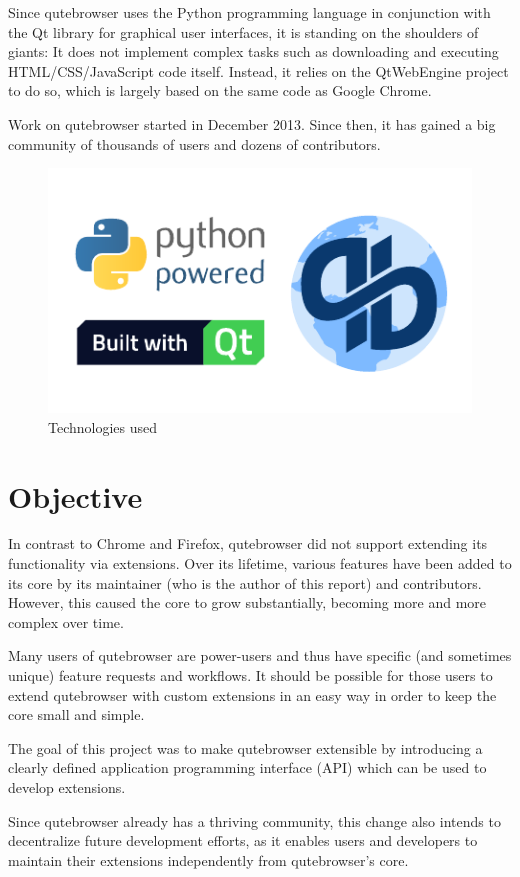 Since qutebrowser uses the Python programming language in conjunction with the
Qt library for graphical user interfaces, it is standing on the shoulders of
giants: It does not implement complex tasks such as downloading and executing
HTML/CSS/JavaScript code itself. Instead, it relies on the QtWebEngine project
to do so, which is largely based on the same code as Google Chrome.

Work on qutebrowser started in December 2013. Since then, it has gained a big
community of thousands of users and dozens of contributors.

\begin{figure}[H]
  \centering
  \includegraphics[width=0.7\linewidth]{img/logos.pdf}
  \caption{Technologies used}
\end{figure}

\section*{Objective}

In contrast to Chrome and Firefox, qutebrowser did not support extending its
functionality via extensions. Over its lifetime, various features have been
added to its core by its maintainer (who is the author of this report) and
contributors. However, this caused the core to grow substantially, becoming more
and more complex over time.

Many users of qutebrowser are power-users and thus have specific (and sometimes
unique) feature requests and workflows. It should be possible for those users to
extend qutebrowser with custom extensions in an easy way in order to keep the
core small and simple.

The goal of this project was to make qutebrowser extensible by introducing a
clearly defined application programming interface (API) which can be used to
develop extensions.

Since qutebrowser already has a thriving community, this change also intends to
decentralize future development efforts, as it enables users and developers to
maintain their extensions independently from qutebrowser's core.

